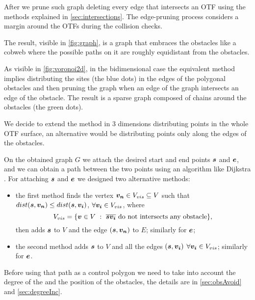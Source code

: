 \documentclass[dissertation.tex]{subfiles}
\begin{document}
After we prune such graph deleting every edge that
intersects an \ac{OTF} using the methods explained in
\cref{sec:intersections}. The edge-pruning process considers a margin
around the \acp{OTF} during the collision checks.

The result, visible in \cref{fig:graph}, is a graph that embraces the
obstacles like a cobweb where the possible paths on it are roughly
equidistant from the obstacles.

As visible
in \cref{fig:voronoi2d},
in the bidimensional case the equivalent method implies distributing
the sites (the blue dots) in the edges of the polygonal obstacles and
then pruning the 
graph when an edge of the graph intersects an edge of the
obstacle. The result is a sparse graph composed of chains around the
obstacles (the green dots).

We decide to extend the method in 3 dimensions distributing points in
the whole \ac{OTF} surface, an alternative would be distributing
points only along the edges of the obstacles.

On the obtained graph $G$ we attach the desired start and end
points $\boldsymbol{s}$ and $\boldsymbol{e}$, and we can obtain a path between the two points using an
algorithm like Dijkstra \cite{dijkstra}\cite{knuth}. For attaching $\boldsymbol{s}$
and $\boldsymbol{e}$ we designed two
alternative methods:
\begin{itemize}
\item the first method finds the vertex $\boldsymbol{v_n}\in V_{vis}\subseteq V$ such
  that $dist(\boldsymbol{s},\boldsymbol{v_n})\leq dist(\boldsymbol{s},\boldsymbol{v_i})$, $\forall
  \boldsymbol{v_i}\in V_{vis}$, where
  \begin{equation*}
    V_{vis}=\{\boldsymbol{v}\in V\ :\ \overline{\boldsymbol{s} \boldsymbol{v_i}}\ \text{do not
      intersects any obstacle}\},
  \end{equation*}
  then adds $\boldsymbol{s}$ to $V$ and the edge $(\boldsymbol{s},\boldsymbol{v_n})$ to $E$;
  similarly for $\boldsymbol{e}$;
\item the second method adds $\boldsymbol{s}$ to $V$ and all the edges $(\boldsymbol{s},\boldsymbol{v_i})$
  $\forall \boldsymbol{v_i}\in V_{vis}$; similarly for $\boldsymbol{e}$.
\end{itemize}

Before using that path as a control polygon
we need to take into account the degree of the \bs and the
position of the obstacles, the details are in \cref{sec:obsAvoid} and
\cref{sec:degreeInc}.
\end{document}
